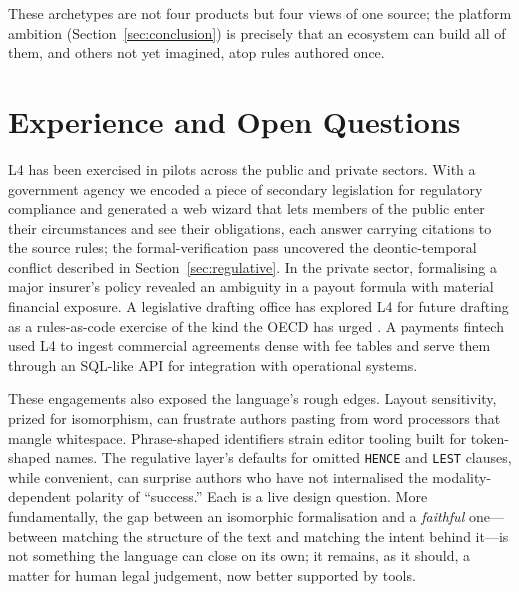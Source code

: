\documentclass[sigconf,nonacm]{acmart}
\newcommand{\code}[1]{\texttt{\small #1}}
\begin{document}
These archetypes are not four products but four views of one source; the
platform ambition (Section~\ref{sec:conclusion}) is precisely that an
ecosystem can build all of them, and others not yet imagined, atop rules
authored once.

\section{Experience and Open Questions}\label{sec:experience}
L4 has been exercised in pilots across the public and private sectors. With
a government agency we encoded a piece of secondary legislation for
regulatory compliance and generated a web wizard that lets members of the
public enter their circumstances and see their obligations, each answer
carrying citations to the source rules; the formal-verification pass
uncovered the deontic-temporal conflict described in
Section~\ref{sec:regulative}. In the private sector, formalising a major
insurer's policy revealed an ambiguity in a payout formula with material
financial exposure. A legislative drafting office has explored L4 for
future drafting as a rules-as-code exercise of the kind the OECD has urged
\cite{mohun2020rulesascode}. A payments fintech used L4 to ingest commercial
agreements dense with fee tables and serve them through an SQL-like API for
integration with operational systems.

These engagements also exposed the language's rough edges. Layout
sensitivity, prized for isomorphism, can frustrate authors pasting from word
processors that mangle whitespace. Phrase-shaped identifiers strain editor
tooling built for token-shaped names. The regulative layer's defaults for
omitted \code{HENCE} and \code{LEST} clauses, while convenient, can surprise
authors who have not internalised the modality-dependent polarity of
``success.'' Each is a live design question. More fundamentally, the gap
between an isomorphic formalisation and a \emph{faithful} one---between
matching the structure of the text and matching the intent behind it---is
not something the language can close on its own; it remains, as it should, a
matter for human legal judgement, now better supported by tools.

\end{document}
